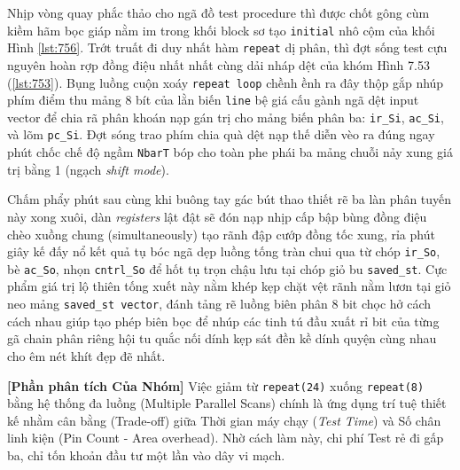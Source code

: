 Nhịp vòng quay phắc thảo cho ngã đồ test procedure thì được chốt gông cùm kiềm hãm bọc giáp nằm im trong khối block sơ tạo \texttt{initial} nhô cộm của khối Hình \ref{lst:756}. Trớt truất đi duy nhất hàm \texttt{repeat} dị phân, thì đợt sống test cựu nguyên hoàn rợp đồng điệu nhất nhất cùng dải nháp dệt của khóm Hình 7.53 (\ref{lst:753}). Bụng luồng cuộn xoáy \texttt{repeat loop} chềnh ềnh ra đây thộp gắp nhúp phím điểm thu mảng 8 bít của lằn biến \texttt{line} bệ giá cấu gành ngã dệt input vector để chia rã phân khoán nạp gán trị cho mảng biến phân ba: \texttt{ir\_Si}, \texttt{ac\_Si}, và lõm \texttt{pc\_Si}. Đợt sóng trao phím chia quà dệt nạp thế diễn vèo ra đúng ngay phút chốc chế độ ngầm \texttt{NbarT} bóp cho toàn phe phái ba mảng chuỗi nảy xung giá trị bằng 1 (ngạch \textit{shift mode}). 

Chấm phẩy phút sau cùng khi buông tay gác bút thao thiết rẽ ba làn phân tuyến này xong xuôi, dàn \textit{registers} lật đật sẽ đón nạp nhịp cấp bập bùng đồng điệu chèo xuồng chung (simultaneously) tạo rãnh đập cướp đồng tốc xung, rỉa phút giây kế đấy nổ kết quả tụ bóc ngã dẹp luồng tống tràn chui qua từ chóp \texttt{ir\_So}, bè \texttt{ac\_So}, nhọn \texttt{cntrl\_So} để hốt tụ trọn chậu lưu tại chóp giỏ bu \texttt{saved\_st}. Cực phẩm giá trị lộ thiên tống xuết này nằm khép kẹp chặt vệt rãnh nằm lươn tại giỏ neo mảng \texttt{saved\_st vector}, đánh tảng rẽ luồng biên phân 8 bit chọc hở cách cách nhau giúp tạo phép biên bọc để nhúp các tinh tú đầu xuất rỉ bit của từng gã chain phân riêng hội tu quắc nối dính kẹp sát đền kề dính quyện cùng nhau cho êm nét khít đẹp đẽ nhất.

\textbf{[Phần phân tích Của Nhóm]} Việc giảm từ \texttt{repeat(24)} xuống \texttt{repeat(8)} bằng hệ thống đa luồng (Multiple Parallel Scans) chính là ứng dụng trí tuệ thiết kế nhằm cân bằng (Trade-off) giữa Thời gian máy chạy (\textit{Test Time}) và Số chân linh kiện (Pin Count - Area overhead). Nhờ cách làm này, chi phí Test rẻ đi gấp ba, chỉ tốn khoản đầu tư một lần vào dây vi mạch.

